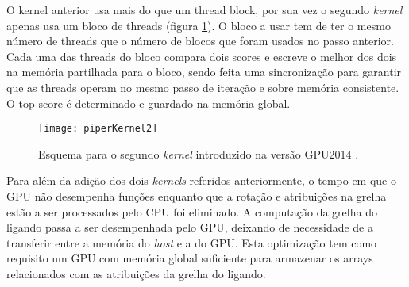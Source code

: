  O kernel anterior usa mais do que um thread block, por sua vez o segundo \textit{kernel} apenas usa um bloco de threads (figura \ref{k2piper}). O bloco a usar tem de ter o mesmo número de threads que o número de blocos que foram usados no passo anterior. Cada uma das threads do bloco compara dois scores e escreve o melhor dos dois na memória partilhada para o bloco, sendo feita uma sincronização para garantir que as threads operam no mesmo passo de iteração e sobre memória consistente. O top score é determinado e guardado na memória global. \par
 \begin{figure}[ht]
  \centering
    {\texttt{[image: piperKernel2]}}
  \caption{Esquema para o segundo \textit{kernel} introduzido na versão GPU2014 \cite{piper2014gpu}. }
  \label{k2piper}
\end{figure}
Para além da adição dos dois \textit{kernels} referidos anteriormente, o tempo em que o GPU não desempenha funções enquanto que a rotação e atribuições na grelha estão a ser processados pelo CPU foi eliminado. A computação da grelha do ligando passa a ser desempenhada pelo GPU, deixando de necessidade de a transferir entre a memória do \textit{host} e a do GPU. Esta optimização tem como requisito um GPU com memória global suficiente para armazenar os arrays relacionados com as atribuições da grelha do ligando. \par
